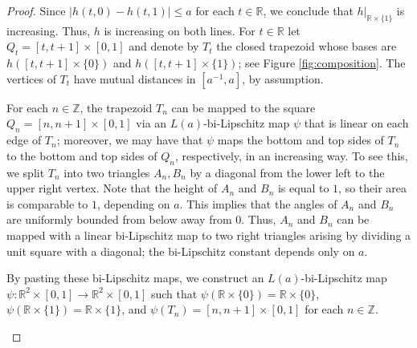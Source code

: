 \documentclass[letterpaper]{amsart}
\theoremstyle{plain}
\theoremstyle{definition}
\theoremstyle{remark}
\numberwithin{equation}{section}
\numberwithin{theorem}{section}
\newcommand{\R}{\mathbb R}
\newcommand{\Z}{\mathbb Z}
\begin{document}
\begin{proof}
Since $|h(t,0)-h(t,1)|\leq a$ for each $t\in \R$, we conclude that $h|_{\R\times \{1\}}$ is increasing. Thus, $h$ is increasing on both lines. For $t\in \R$ let $Q_t=[t,t+1]\times [0,1]$ and denote by $T_t$ the closed trapezoid whose bases are $h([t,t+1]\times \{0\})$ and $h([t,t+1]\times \{1\})$; see Figure \ref{fig:composition}. The vertices of $T_t$ have mutual distances in $[a^{-1},a]$, by assumption. 

For each $n\in \Z$, the trapezoid $T_n$ can be mapped to the square $Q_n=[n,n+1]\times [0,1]$ via an $L(a)$-bi-Lipschitz map $\psi$ that is linear on each edge of $T_n$; moreover, we may have that $\psi$ maps the bottom and top sides of $T_n$ to the bottom and top sides of $Q_n$, respectively, in an increasing way. To see this, we split $T_n$ into two triangles $A_n,B_n$ by a diagonal from the lower left to the upper right vertex. Note that the height of $A_n$ and $B_n$ is equal to $1$, so their area is comparable to $1$, depending on $a$. This implies that the angles of $A_n$ and $B_n$ are uniformly bounded from below away from $0$. Thus, $A_n$ and $B_n$ can be mapped with a linear bi-Lipschitz map to two right triangles arising by dividing a unit square with a diagonal; the bi-Lipschitz constant depends only on $a$.  

By pasting these bi-Lipschitz maps, we construct an $L(a)$-bi-Lipschitz map $\psi\colon \R^2\times [0,1]\to \R^2\times [0,1]$ such that $\psi(\R\times \{0\})=\R\times \{0\}$, $\psi(\R\times \{1\})=\R\times \{1\}$, and $\psi(T_n)=[n,n+1]\times [0,1]$ for each $n\in \Z$. 

\begin{figure}
	\centering
\end{figure}
\end{proof}
\end{document}
